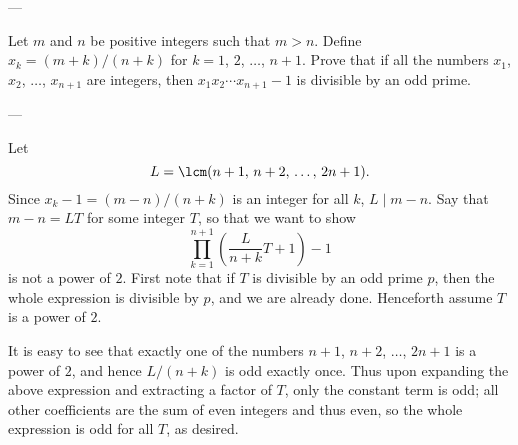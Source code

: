 
---

Let $m$ and $n$ be positive integers such that $m>n$. Define $x_k=(m+k)/(n+k)$ for $k=1$, $2$, $\ldots$, $n+1$. Prove that if all the numbers $x_1$, $x_2$, $\ldots$, $x_{n+1}$ are integers, then $x_1x_2\cdots x_{n+1}-1$ is divisible by an odd prime.

---

Let \[L=\lcm(n+1,\,n+2,\,\ldots,\,2n+1).\]
Since $x_k-1=(m-n)/(n+k)$ is an integer for all $k$, $L\mid m-n$. Say that $m-n=LT$ for some integer $T$, so that we want to show \[\prod_{k=1}^{n+1}\left(\frac L{n+k}T+1\right)-1\]
is not a power of $2$. First note that if $T$ is divisible by an odd prime $p$, then the whole expression is divisible by $p$, and we are already done. Henceforth assume $T$ is a power of $2$.

It is easy to see that exactly one of the numbers $n+1$, $n+2$, $\ldots$, $2n+1$ is a power of $2$, and hence $L/(n+k)$ is odd exactly once. Thus upon expanding the above expression and extracting a factor of $T$, only the constant term is odd; all other coefficients are the sum of even integers and thus even, so the whole expression is odd for all $T$, as desired.
